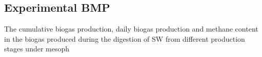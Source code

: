 \subsection{Experimental BMP}
The cumulative biogas production, daily biogas production and methane content in the biogas produced during the digestion of SW from different production stages under mesoph